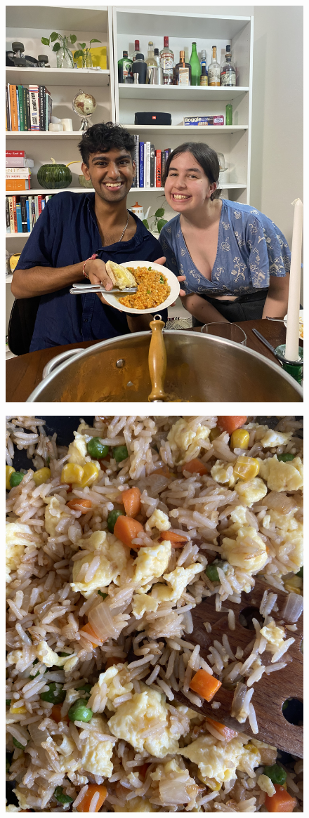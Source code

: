 \documentclass[]{article}
\begin{document}
\newpage\begin{figure}[H]
\begin{center}\hyperref[rec:Caramelised Onion and Tomato Risotto]{\includegraphics[keepaspectratio,width=\textheight,height=\textwidth,angle=-90]{Gallery/Caramelised Onion and Tomato Risotto}}\caption*{}\label{fig:Caramelised Onion and Tomato Risotto}\end{center}
\end{figure}
\newpage\begin{figure}[H]
\begin{center}\hyperref[rec:Chinese Fried Rice]{\includegraphics[keepaspectratio,width=\textheight,height=\textwidth,angle=-90]{Gallery/Chinese Fried Rice}}\caption*{}\label{fig:Chinese Fried Rice}\end{center}
\end{figure}
\end{document}
